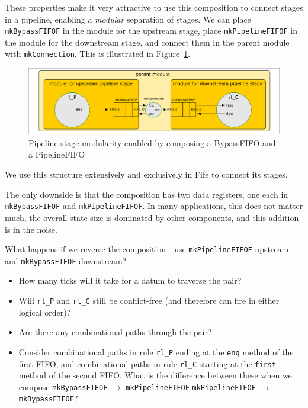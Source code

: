 These properties make it very attractive to use this composition to
connect stages in a pipeline, enabling a \emph{modular} separation of
stages.  We can place \verb|mkBypassFIFOF| in the module for the
upstream stage, place \verb|mkPipelineFIFOF| in the module for the
downstream stage, and connect them in the parent module with
\verb|mkConnection|.
This is illustrated in Figure~\ref{Fig_Composed_FIFO_modularity}.
\begin{figure}[htbp]
  \centerline{\includegraphics[width=6in,angle=0]{Figures/Fig_Composed_FIFO_modularity}}
  \caption{\label{Fig_Composed_FIFO_modularity}
                  Pipeline-stage modularity enabled by composing a BypassFIFO and a PipelineFIFO}
\end{figure}
We use this structure extensively and exclusively in Fife to connect
its stages.

The only downside is that the composition has two data registers, one
each in \verb|mkBypassFIFOF| and \verb|mkPipelineFIFOF|.  In many
applications, this does not matter much, {\ie} the overall state size
is dominated by other components, and this addition is in the noise.

\Exercise

What happens if we reverse the composition---use
\verb|mkPipelineFIFOF| upstream and \verb|mkBypassFIFOF| downstream?

\begin{itemize}

 \item How many ticks will it take for a datum to traverse the pair?

 \item Will \verb|rl_P| and \verb|rl_C| still be conflict-free (and
       therefore can fire in either logical order)?

 \item Are there any combinational paths through the pair?

 \item Consider combinational paths in rule \verb|rl_P| ending at the
       \verb|enq| method of the first FIFO, and combinational paths in
       rule \verb|rl_C| starting at the \verb|first| method of the
       second FIFO.  What is the difference between these when we
       compose \verb|mkBypassFIFOF| $\longrightarrow$ \verb|mkPipelineFIFOF|
       {\vs} \verb|mkPipelineFIFOF| $\longrightarrow$ \verb|mkBypassFIFOF|?

\end{itemize}


